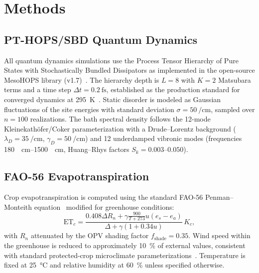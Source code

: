 \documentclass[12pt]{article}
\begin{document}

\section*{Methods}

\subsection*{PT-HOPS/SBD Quantum Dynamics}

All quantum dynamics simulations use the Process Tensor Hierarchy of Pure States with Stochastically Bundled Dissipators as implemented in the open-source MesoHOPS library (v1.7)~\cite{Varvelo2021}.
The hierarchy depth is $L = 8$ with $K = 2$ Matsubara terms and a time step $\Delta t = \SI{0.2}{\fs}$, established as the production standard for converged dynamics at \SI{295}{\kelvin}~\cite{Kouam2026}.
Static disorder is modeled as Gaussian fluctuations of the site energies with standard deviation $\sigma = \SI{50}{\per\cm}$, sampled over $n = 100$ realizations.
The bath spectral density follows the 12-mode Kleinekath\"{o}fer/Coker parameterization with a Drude--Lorentz background ($\lambda_D = \SI{35}{\per\cm}$, $\gamma_D = \SI{50}{\per\cm}$) and 12 underdamped vibronic modes (frequencies \SIrange{180}{1500}{\per\cm}, Huang--Rhys factors $S_k = \numrange{0.003}{0.050}$).

\subsection*{FAO-56 Evapotranspiration}

Crop evapotranspiration is computed using the standard FAO-56 Penman--Monteith equation~\cite{Allen1998} modified for greenhouse conditions:
\begin{equation}
\mathrm{ET}_c = \frac{0.408 \Delta R_n + \gamma \frac{900}{T+273} u (e_s - e_a)}{\Delta + \gamma(1 + 0.34 u)} \, K_c,
\end{equation}
with $R_n$ attenuated by the OPV shading factor $f_{\mathrm{shade}} = 0.35$.
Wind speed within the greenhouse is reduced to approximately \SI{10}{\percent} of external values, consistent with standard protected-crop microclimate parameterizations~\cite{Allen1998}.
Temperature is fixed at \SI{25}{\celsius} and relative humidity at \SI{60}{\percent} unless specified otherwise.
\end{document}
